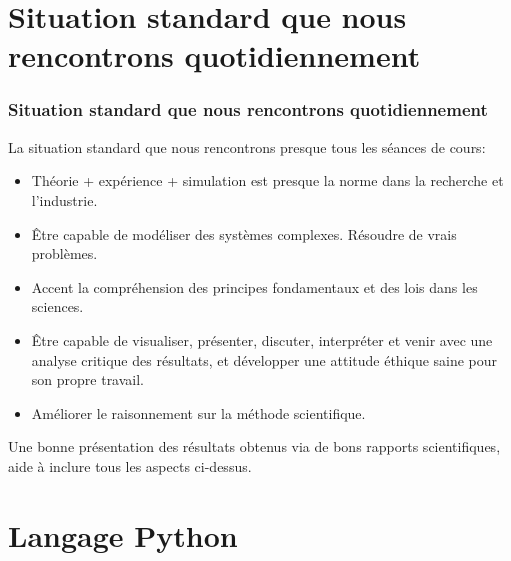 \documentclass{beamer}
\begin{document}
\section{Situation standard que nous rencontrons quotidiennement}

\begin{frame}
\frametitle{Situation standard que nous rencontrons quotidiennement}


La situation standard que nous rencontrons presque tous les séances de cours:

\begin{itemize}
\item Théorie + expérience + simulation est presque la norme dans la recherche et l'industrie.

\item Être capable de modéliser des systèmes complexes. Résoudre de vrais problèmes.

\item Accent la compréhension des principes fondamentaux et des lois dans les sciences.

\item Être capable de visualiser, présenter, discuter, interpréter et venir avec une analyse critique des résultats, et développer une attitude éthique saine pour son propre travail.

\item Améliorer le raisonnement sur la méthode scientifique.
\end{itemize}

\noindent
Une bonne présentation des résultats obtenus via de bons rapports scientifiques, aide à inclure tous les aspects ci-dessus.


\end{frame}

\section{Langage Python}
\end{document}

